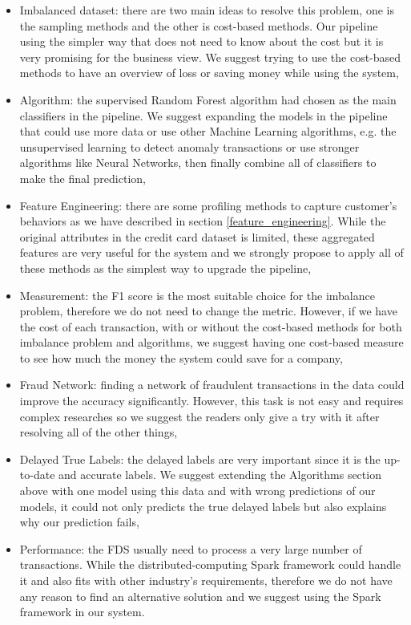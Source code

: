 \begin{itemize}
\item Imbalanced dataset: there are two main ideas to resolve this problem, one is the sampling methods and the other is cost-based methods. Our pipeline using the simpler way that does not need to know about the cost but it is very promising for the business view. We suggest trying to use the cost-based methods to have an overview of loss or saving money while using the system,
\item Algorithm: the supervised Random Forest algorithm had chosen as the main classifiers in the pipeline. We suggest expanding the models in the pipeline that could use more data or use other Machine Learning algorithms, e.g. the unsupervised learning to detect anomaly transactions or use stronger algorithms like Neural Networks, then finally combine all of classifiers to make the final prediction,
\item Feature Engineering: there are some profiling methods to capture customer's behaviors as we have described in section \ref{feature_engineering}. While the original attributes in the credit card dataset is limited, these aggregated features are very useful for the system and we strongly propose to apply all of these methods as the simplest way to upgrade the pipeline,
\item Measurement: the F1 score is the most suitable choice for the imbalance problem, therefore we do not need to change the metric. However, if we have the cost of each transaction, with or without the cost-based methods for both imbalance problem and algorithms, we suggest having one cost-based measure to see how much the money the system could save for a company,
\item Fraud Network: finding a network of fraudulent transactions in the data could improve the accuracy significantly. However, this task is not easy and requires complex researches so we suggest the readers only give a try with it after resolving all of the other things,
\item Delayed True Labels: the delayed labels are very important since it is the up-to-date and accurate labels. We suggest extending the Algorithms section above with one model using this data and with wrong predictions of our models, it could not only predicts the true delayed labels but also explains why our prediction fails,
\item Performance: the FDS usually need to process a very large number of transactions. While the distributed-computing Spark framework could handle it and also fits with other industry's requirements, therefore we do not have any reason to find an alternative solution and we suggest using the Spark framework in our system.
\end{itemize}


